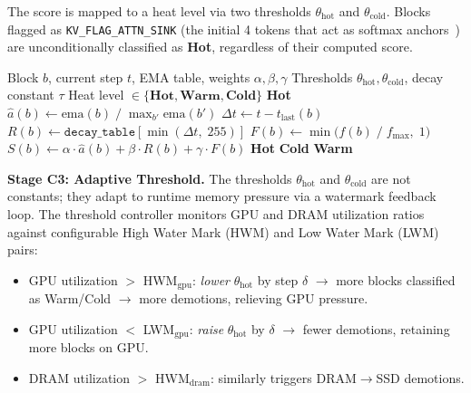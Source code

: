 \documentclass[conference]{IEEEtran}
\begin{document}
The score is mapped to a heat level via two thresholds $\theta_{\text{hot}}$ and $\theta_{\text{cold}}$. Blocks flagged as \texttt{KV\_FLAG\_ATTN\_SINK} (the initial 4 tokens that act as softmax anchors~\cite{streamingllm}) are unconditionally classified as \textbf{Hot}, regardless of their computed score.

\begin{algorithm}[t]
\caption{Per-Block Hot-Cold Classification (C1+C2)}
\label{alg:classify}
\begin{algorithmic}[1]
\Require Block $b$, current step $t$, EMA table, weights $\alpha, \beta, \gamma$
\Require Thresholds $\theta_{\text{hot}}, \theta_{\text{cold}}$, decay constant $\tau$
\Ensure Heat level $\in \{\textbf{Hot}, \textbf{Warm}, \textbf{Cold}\}$
\Statex
{} 
    \State \Return \textbf{Hot}
\EndIf
\Statex
\State $\hat{a}(b) \gets \text{ema}(b) \;/\; \max_{b'} \text{ema}(b')$ 
\State $\Delta t \gets t - t_{\text{last}}(b)$ 
\State $R(b) \gets \texttt{decay\_table}[\min(\Delta t,\; 255)]$ 
\State $F(b) \gets \min\bigl(f(b) \;/\; f_{\max},\; 1\bigr)$ 
\Statex
\State $S(b) \gets \alpha \cdot \hat{a}(b) + \beta \cdot R(b) + \gamma \cdot F(b)$ 
\Statex
{}
    \State \Return \textbf{Hot} 
    \State \Return \textbf{Cold} 
\Else
    \State \Return \textbf{Warm} 
\EndIf
\end{algorithmic}
\end{algorithm}

\textbf{Stage C3: Adaptive Threshold.} The thresholds $\theta_{\text{hot}}$ and $\theta_{\text{cold}}$ are not constants; they adapt to runtime memory pressure via a watermark feedback loop. The threshold controller monitors GPU and DRAM utilization ratios against configurable High Water Mark (HWM) and Low Water Mark (LWM) pairs:

\begin{itemize}
\item GPU utilization $>$ HWM$_{\text{gpu}}$: \emph{lower} $\theta_{\text{hot}}$ by step $\delta$ $\to$ more blocks classified as Warm/Cold $\to$ more demotions, relieving GPU pressure.
\item GPU utilization $<$ LWM$_{\text{gpu}}$: \emph{raise} $\theta_{\text{hot}}$ by $\delta$ $\to$ fewer demotions, retaining more blocks on GPU.
\item DRAM utilization $>$ HWM$_{\text{dram}}$: similarly triggers DRAM$\to$SSD demotions.
\end{itemize}
\end{document}
